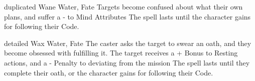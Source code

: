 \ifodd\value{diceNo}

  {duplicated}%
  {Wane}%
  {Water, Fate}%
  {}%
  {Targets become confused about what their own plans, and suffer a - to Mind Attributes}%
  {The spell lasts until the character gains  for following their Code.}

\else

  {detailed}%
  {Wax}%
  {Water, Fate}%
  {}%
  {The caster asks the target to swear an oath, and they become obsessed with fulfilling it.
  The target receives a + Bonus to Resting actions, and a - Penalty to deviating from the mission}%
  {The spell lasts until they complete their oath, or the character gains  for following their Code.}

\fi
{}
